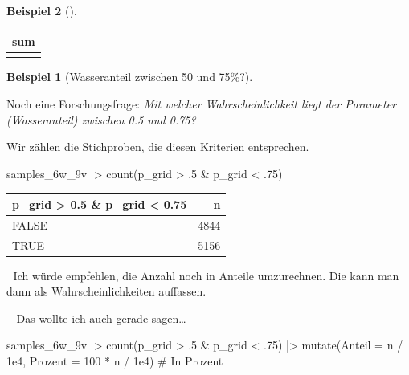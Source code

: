 \documentclass[
  ngerman,
  letterpaper,
  twoside,
  open=any]{scrbook}
\newenvironment{Shaded}{\begin{snugshade}}{\end{snugshade}}
\newcommand{\AttributeTok}[1]{\textcolor[rgb]{0.40,0.45,0.13}{#1}}
\newcommand{\CommentTok}[1]{\textcolor[rgb]{0.37,0.37,0.37}{#1}}
\newcommand{\DecValTok}[1]{\textcolor[rgb]{0.68,0.00,0.00}{#1}}
\newcommand{\FloatTok}[1]{\textcolor[rgb]{0.68,0.00,0.00}{#1}}
\newcommand{\FunctionTok}[1]{\textcolor[rgb]{0.28,0.35,0.67}{#1}}
\newcommand{\NormalTok}[1]{\textcolor[rgb]{0.00,0.23,0.31}{#1}}
\newcommand{\SpecialCharTok}[1]{\textcolor[rgb]{0.37,0.37,0.37}{#1}}
\newcounter{none} %
\theoremstyle{definition}
\newtheorem{example}{Beispiel}[chapter]
\theoremstyle{plain}
\theoremstyle{definition}
\theoremstyle{definition}
\theoremstyle{remark}
\begin{document}
\begin{example}[]
{\def\LTcaptype{none} %
\begin{longtable}[]{@{}r@{}}
\toprule\noalign{}
sum \\
\midrule\noalign{}
\endhead
\bottomrule\noalign{}
\endlastfoot
0.1 \\
\end{longtable}
}

\begin{example}[Wasseranteil zwischen 50 und
75\%?]\protect\hypertarget{exm-param2}{}\label{exm-param2}

Noch eine Forschungsfrage: \emph{Mit welcher Wahrscheinlichkeit liegt
der Parameter (Wasseranteil) zwischen 0.5 und 0.75?}

Wir zählen die Stichproben, die diesen Kriterien entsprechen.

\begin{Shaded}
\begin{Highlighting}[]
\NormalTok{samples\_6w\_9v }\SpecialCharTok{|\textgreater{}} 
  \FunctionTok{count}\NormalTok{(p\_grid }\SpecialCharTok{\textgreater{}}\NormalTok{ .}\DecValTok{5} \SpecialCharTok{\&}\NormalTok{ p\_grid }\SpecialCharTok{\textless{}}\NormalTok{ .}\DecValTok{75}\NormalTok{)}
\end{Highlighting}
\end{Shaded}

{\def\LTcaptype{none} %
\begin{longtable}[]{@{}lr@{}}
\toprule\noalign{}
p\_grid \textgreater{} 0.5 \& p\_grid \textless{} 0.75 & n \\
\midrule\noalign{}
\endhead
\bottomrule\noalign{}
\endlastfoot
FALSE & 4844 \\
TRUE & 5156 \\
\end{longtable}
}

\begin{displayquote}
🤖 Ich würde empfehlen, die Anzahl noch in Anteile umzurechnen. Die kann
man dann als Wahrscheinlichkeiten auffassen.
\end{displayquote}

\begin{displayquote}
👨🏫 Das wollte ich auch gerade sagen\ldots{}
\end{displayquote}

\begin{Shaded}
\begin{Highlighting}[]
\NormalTok{samples\_6w\_9v }\SpecialCharTok{|\textgreater{}}
  \FunctionTok{count}\NormalTok{(p\_grid }\SpecialCharTok{\textgreater{}}\NormalTok{ .}\DecValTok{5} \SpecialCharTok{\&}\NormalTok{ p\_grid }\SpecialCharTok{\textless{}}\NormalTok{ .}\DecValTok{75}\NormalTok{) }\SpecialCharTok{|\textgreater{}}
  \FunctionTok{mutate}\NormalTok{(}\AttributeTok{Anteil =}\NormalTok{ n }\SpecialCharTok{/} \FloatTok{1e4}\NormalTok{,}
         \AttributeTok{Prozent =} \DecValTok{100} \SpecialCharTok{*}\NormalTok{ n }\SpecialCharTok{/} \FloatTok{1e4}\NormalTok{)  }\CommentTok{\# In Prozent}
\end{Highlighting}
\end{Shaded}


\end{example}
\end{example}
\end{document}
